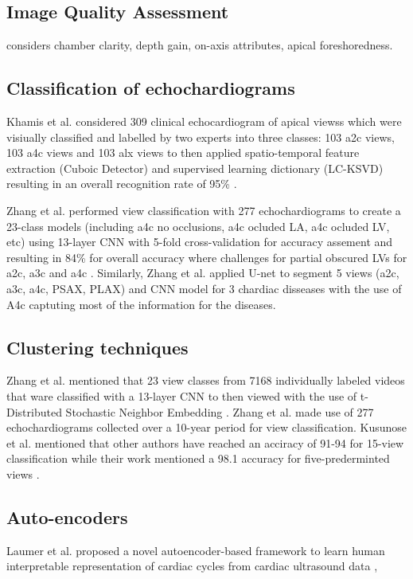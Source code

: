 \subsection{Image Quality Assessment}
\cite{labs2021_in_miua} considers chamber clarity, depth gain, on-axis attributes, apical foreshoredness.

\subsection{Classification of echochardiograms}
Khamis et al. considered 309 clinical echocardiogram of apical viewss which were visiually classified and labelled by two experts into three classes: 103 a2c views, 103 a4c views and 103 alx views to then applied spatio-temporal feature extraction (Cuboic Detector) and supervised learning dictionary (LC-KSVD) resulting in an overall recognition rate of 95\% \cite{khamis2017}.

Zhang et al. performed view classification with 277 echochardiograms to create a 23-class models (including a4c no occlusions, a4c ocluded LA, a4c ocluded LV, etc) using 13-layer CNN with 5-fold cross-validation for accuracy assement and resulting in 84\% for overall accuracy where challenges for partial obscured LVs for a2c, a3c and a4c \cite{zhang2018}.
Similarly, Zhang et al. applied U-net to segment 5 views (a2c, a3c, a4c, PSAX, PLAX) and CNN model for 3 chardiac disseases with the use of A4c captuting most of the information for the diseases.



\subsection{Clustering techniques}
Zhang et al. mentioned that 23 view classes from 7168 individually labeled videos that ware classified with a 13-layer CNN to then viewed with the use of t-Distributed Stochastic Neighbor Embedding \cite{zhang2018}.
Zhang et al. made use of 277 echochardiograms collected over a 10-year period for view classification.
Kusunose et al. mentioned that other authors have reached an acciracy of 91-94 for 15-view classification while their work mentioned a 98.1 accuracy for five-prederminted views \cite{kusunose2021}.

\subsection{Auto-encoders}
Laumer et al. proposed a novel autoencoder-based framework to learn human interpretable representation of cardiac cycles from cardiac ultrasound data \cite{laumer2020},

